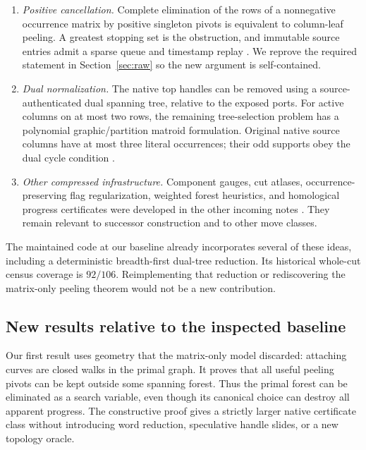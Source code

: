 \begin{enumerate}
\item \emph{Positive cancellation.}  Complete elimination of the rows of
a nonnegative occurrence matrix by positive singleton pivots is equivalent
to column-leaf peeling.  A greatest stopping set is the obstruction, and
immutable source entries admit a sparse queue and timestamp replay
\cite{IncomingPositive}.  We reprove the required statement in
Section~\ref{sec:raw} so the new argument is self-contained.
\item \emph{Dual normalization.}  The native top handles can be removed
using a source-authenticated dual spanning tree, relative to the exposed
ports.  For active columns on at most two rows, the remaining tree-selection
problem has a polynomial graphic/partition matroid formulation.  Original
native source columns have at most three literal occurrences; their odd
supports obey the dual cycle condition \cite{IncomingDualNormalization}.
\item \emph{Other compressed infrastructure.}  Component gauges, cut
atlases, occurrence-preserving flag regularization, weighted forest
heuristics, and homological progress certificates were developed in the
other incoming notes \cite{IncomingGauges,IncomingFlags,IncomingProgress}.
They remain relevant to successor construction and to other move classes.
\end{enumerate}

The maintained code at our baseline already incorporates several of these
ideas, including a deterministic breadth-first dual-tree reduction.  Its
historical whole-cut census coverage is $92/106$.  Reimplementing that
reduction or rediscovering the matrix-only peeling theorem would not be a
new contribution.

\subsection{New results relative to the inspected baseline}

Our first result uses geometry that the matrix-only model discarded:
attaching curves are closed walks in the primal graph.  It proves that
all useful peeling pivots can be kept outside some spanning forest.  Thus
the primal forest can be eliminated as a search variable, even though its
canonical choice can destroy all apparent progress.  The constructive
proof gives a strictly larger native certificate class without introducing
word reduction, speculative handle slides, or a new topology oracle.

